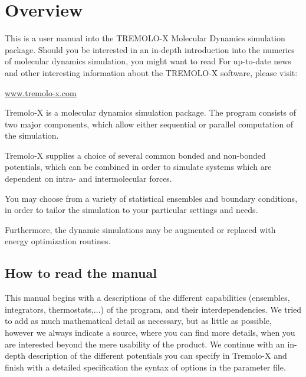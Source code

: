 \chapter{Overview}


This is a user manual into the TREMOLO-X Molecular Dynamics simulation package.
Should you be interested in an in-depth introduction into the numerics of molecular dynamics simulation, you might want to read \cite{GriebelEng}
\bigbreak
For up-to-date news and other interesting information about the \mbox{TREMOLO-X} software, please visit:
\begin{center}
 \url{www.tremolo-x.com} 
\end{center}

Tremolo-X is a molecular dynamics simulation package. The program consists of two major components, which allow either sequential or parallel computation of the simulation.

Tremolo-X supplies a choice of several common bonded and non-bonded potentials, which can be combined in order to simulate systems which are dependent on intra- and intermolecular forces.

You may choose from a variety of statistical ensembles and boundary conditions, in order to tailor the simulation to your particular settings and needs.

Furthermore, the dynamic simulations may be augmented or replaced with energy optimization routines.

\section{How to read the manual}

This manual begins with a descriptions of the different capabilities (ensembles, integrators, thermostats,...) of the program, and their interdependencies. We tried to add as much mathematical detail as necessary, but as little as possible, however we always indicate a source, where you can find more details, when you are interested beyond the mere usability of the product.
We continue with an in-depth description of the different potentials you can specify in Tremolo-X and finish with a detailed specification the syntax of options in the parameter file.
